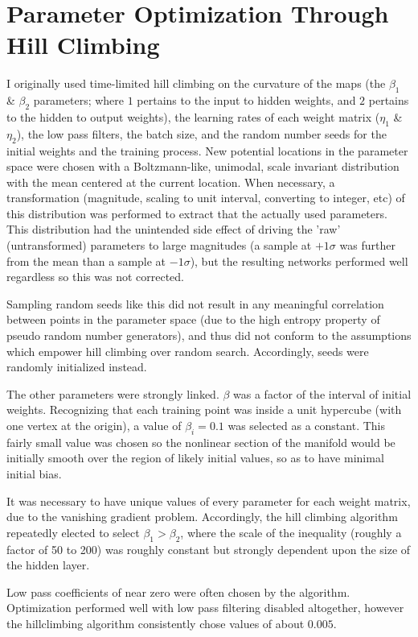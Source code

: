 \documentclass[10pt, conference, compsocconf]{IEEEtran}
\begin{document}
\section{Parameter Optimization Through Hill Climbing}
I originally used time-limited hill climbing on the curvature of the maps (the $\beta_1$ \& $\beta_2$ parameters; where $1$ pertains to the input to hidden weights, and $2$ pertains to the hidden to output weights), the learning rates of each weight matrix ($\eta_1$ \& $\eta_2$), the low pass filters, the batch size, and the random number seeds for the initial weights and the training process. New potential locations in the parameter space were chosen with a Boltzmann-like, unimodal, scale invariant distribution with the mean centered at the current location. When necessary, a transformation (magnitude, scaling to unit interval, converting to integer, etc) of this distribution was performed to extract that the actually used parameters. This distribution had the unintended side effect of driving the 'raw' (untransformed) parameters to large magnitudes (a sample at $+1 \sigma$ was further from the mean than a sample at $-1 \sigma$), but the resulting networks performed well regardless so this was not corrected.

Sampling random seeds like this did not result in any meaningful correlation between points in the parameter space (due to the high entropy property of pseudo random number generators), and thus did not conform to the assumptions which empower hill climbing over random search. Accordingly, seeds were randomly initialized instead. 

The other parameters were strongly linked. $\beta$ was a factor of the interval of initial weights. Recognizing that each training point was inside a unit hypercube (with one vertex at the origin), a value of $\beta_i=0.1$ was selected as a constant. This fairly small value was chosen so the nonlinear section of the manifold would be initially smooth over the region of likely initial values, so as to have minimal initial bias.

It was necessary to have unique values of every parameter for each weight matrix, due to the vanishing gradient problem. Accordingly, the hill climbing algorithm repeatedly elected to select $\beta_1 > \beta_2$, where the scale of the inequality (roughly a factor of 50 to 200) was roughly constant but strongly dependent upon the size of the hidden layer.

Low pass coefficients of near zero were often chosen by the algorithm. Optimization performed well with low pass filtering disabled altogether, however the hillclimbing algorithm consistently chose values of about $0.005$.
\end{document}
